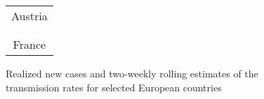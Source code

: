 \documentclass[12pt]{article}
\begin{document}
\begin{figure}[!p]%
\caption
{Realized new cases and two-weekly rolling estimates of the transmission rates for selected European countries}%
\label{fig: Euro_dc_TR_fixMF}%
\vspace{-0.3cm}%


\begin{center}%
\hspace*{-0.2cm}%
\begin{tabular}
[c]{cc}%
\multicolumn{2}{c}{{\footnotesize Austria}}\\%
{\includegraphics[
height=1.7763in,
width=3.5293in
]%
{figs/Austria_dcT.png}%
}
&
{\includegraphics[
height=1.7763in,
width=3.5293in
]%
{figs/Austria_TR_2W_cmp_MF.png}%
}
\\
& \\
\multicolumn{2}{c}{{\footnotesize France}}\\%

\end{tabular}
\end{center}
\end{figure}
\end{document}
